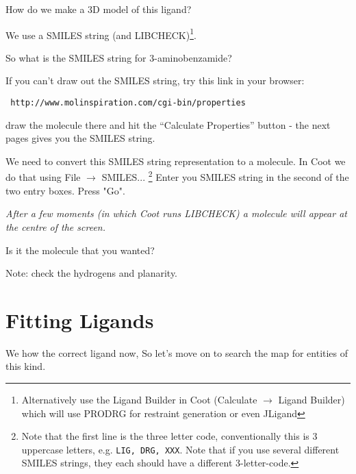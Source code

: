 \documentclass{article}
\begin{document}
\begin{trivlist}
\item  How do we make a 3D model of this ligand?

\textsf{We use a SMILES string (and LIBCHECK)\footnote{Alternatively use the Ligand Builder in Coot (\textsf{Calculate $\rightarrow$ Ligand Builder}) which will use PRODRG for restraint generation or even JLigand}.}
\end{trivlist}


\begin{trivlist}
\item So what is the SMILES string for 3-aminobenzamide?
\end{trivlist}


 If you can't draw out the SMILES string, try this link in your browser:

\texttt{ http://www.molinspiration.com/cgi-bin/properties}
\begin{trivlist}
\item  draw the molecule there and hit the ``Calculate Properties'' button - the
 next pages gives you the SMILES string.

\end{trivlist}

We need to convert this SMILES string representation to a molecule.
In Coot we do that using \textsf{File $\rightarrow$ SMILES...}
\footnote{ Note that the first line is the three letter code,
  conventionally this is 3 uppercase letters, e.g. \texttt{LIG, DRG,
    XXX}.  Note that if you use several different SMILES strings, they
  each should have a different 3-letter-code.} Enter you SMILES string
in the second of the two entry boxes. Press "Go".

\textsl{ After a few moments (in which Coot runs LIBCHECK) a molecule
  will appear at the centre of the screen.}

 \begin{trivlist}
 \item Is it the molecule that you wanted?  

 \textsf{Note: check the hydrogens and planarity.}
 \end{trivlist}


\section{Fitting Ligands}

We how the correct ligand now, So let's move on to search the map for
entities of this kind.
\end{document}

